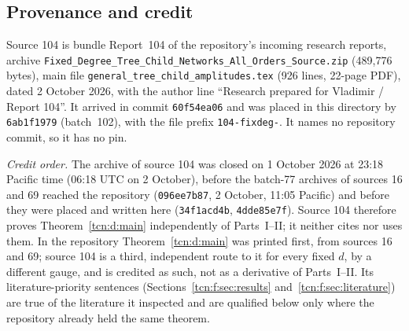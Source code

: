 \documentclass[11pt,letterpaper]{article}
\theoremstyle{remark}
\begin{document}
\subsection{Provenance and credit}\label{tcn:f:sec:provenance}
Source 104 is bundle Report~104 of the repository's incoming research reports, archive \textup{\nolinkurl{Fixed_Degree_Tree_Child_Networks_All_Orders_Source.zip}} (489,776 bytes), main file \textup{\nolinkurl{general_tree_child_amplitudes.tex}} (926 lines, 22-page PDF), dated 2 October 2026, with the author line ``Research prepared for Vladimir / Report 104''. It arrived in commit \texttt{60f54ea06} and was placed in this directory by \texttt{6ab1f1979} (batch~102), with the file prefix \textup{\nolinkurl{104-fixdeg-}}. It names no repository commit, so it has no pin.

\emph{Credit order.} The archive of source 104 was closed on 1 October 2026 at 23:18 Pacific time (06:18 UTC on 2 October), before the batch-77 archives of sources 16 and 69 reached the repository (\texttt{096ee7b87}, 2 October, 11:05 Pacific) and before they were placed and written here (\texttt{34f1acd4b}, \texttt{4dde85e7f}). Source 104 therefore proves Theorem~\ref{tcn:d:main} independently of Parts~I--II; it neither cites nor uses them. In the repository Theorem~\ref{tcn:d:main} was printed first, from sources 16 and 69; source 104 is a third, independent route to it for every fixed $d$, by a different gauge, and is credited as such, not as a derivative of Parts~I--II. Its literature-priority sentences (Sections~\ref{tcn:f:sec:results} and~\ref{tcn:f:sec:literature}) are true of the literature it inspected and are qualified below only where the repository already held the same theorem.
\end{document}
